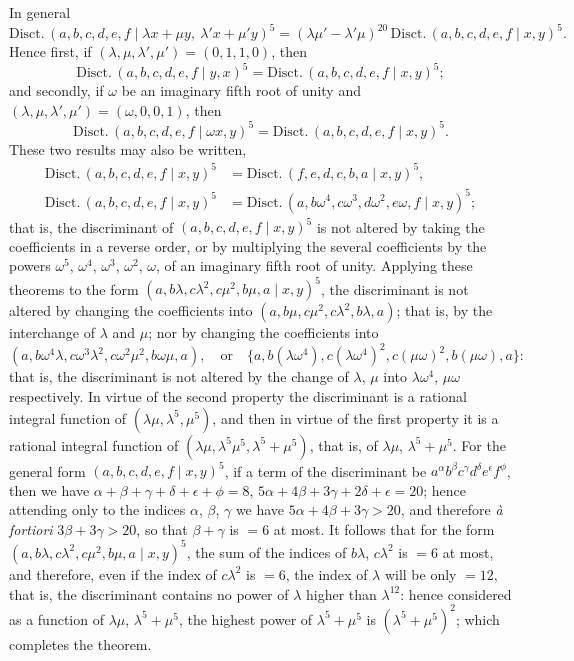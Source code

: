 \documentclass[11pt,a4paper]{article}
\renewcommand{\mid}{\mathbin{|}}
\begin{document}
In general
\[
\text{Disct.}\,(a, b, c, d, e, f\!\!\mid\!\lambda x+\mu y,\ \lambda'x+\mu'y)^5 = (\lambda\mu' - \lambda'\mu)^{20}\,\text{Disct.}\,(a, b, c, d, e, f\!\!\mid\! x, y)^5.
\]
Hence first, if $(\lambda, \mu, \lambda', \mu') = (0, 1, 1, 0)$, then
\[
\text{Disct.}\,(a, b, c, d, e, f\!\!\mid\! y, x)^5 = \text{Disct.}\,(a, b, c, d, e, f\!\!\mid\! x, y)^5;
\]
and secondly, if $\omega$ be an imaginary fifth root of unity and $(\lambda, \mu, \lambda', \mu') = (\omega, 0, 0, 1)$,
then
\[
\text{Disct.}\,(a, b, c, d, e, f\!\!\mid\! \omega x, y)^5 = \text{Disct.}\,(a, b, c, d, e, f\!\!\mid\! x, y)^5.
\]
These two results may also be written,
\begin{align*}
\text{Disct.}\,(a, b, c, d, e, f\!\!\mid\! x, y)^5 &= \text{Disct.}\,(f, e, d, c, b, a\!\!\mid\! x, y)^5,\\
\text{Disct.}\,(a, b, c, d, e, f\!\!\mid\! x, y)^5 &= \text{Disct.}\,(a, b\omega^4, c\omega^3, d\omega^2, e\omega, f\!\!\mid\! x, y)^5;
\end{align*}
that is, the discriminant of $(a, b, c, d, e, f\!\!\mid\! x, y)^5$ is not altered by taking the coefficients in
a reverse order, or by multiplying the several coefficients by the powers $\omega^5$, $\omega^4$, $\omega^3$, $\omega^2$, $\omega$, of an
imaginary fifth root of unity. Applying these theorems to the form $(a, b\lambda, c\lambda^2, c\mu^2, b\mu, a\!\!\mid\! x, y)^5$,
the discriminant is not altered by changing the coefficients into $(a, b\mu, c\mu^2, c\lambda^2, b\lambda, a)$;
that is, by the interchange of $\lambda$ and $\mu$; nor by changing the coefficients into
\[
(a, b\omega^4\lambda, c\omega^3\lambda^2, c\omega^2\mu^2, b\omega\mu, a), \quad \text{or}\quad \{a, b(\lambda\omega^4), c(\lambda\omega^4)^2, c(\mu\omega)^2, b(\mu\omega), a\}:
\]
that is, the discriminant is not altered by the change of $\lambda$, $\mu$ into $\lambda\omega^4$, $\mu\omega$ respectively. In
virtue of the second property the discriminant is a rational integral function of $(\lambda\mu, \lambda^5, \mu^5)$,
and then in virtue of the first property it is a rational integral function of $(\lambda\mu, \lambda^5\mu^5, \lambda^5+\mu^5)$,
that is, of $\lambda\mu$, $\lambda^5+\mu^5$. For the general form $(a, b, c, d, e, f\!\!\mid\! x, y)^5$, if a term of the
discriminant be $a^\alpha b^\beta c^\gamma d^\delta e^\epsilon f^\phi$, then we have $\alpha+\beta+\gamma+\delta+\epsilon+\phi=8$, $5\alpha+4\beta+3\gamma+2\delta+\epsilon=20$;
hence attending only to the indices $\alpha$, $\beta$, $\gamma$ we have $5\alpha+4\beta+3\gamma > 20$, and therefore
\textit{\`{a} fortiori} $3\beta+3\gamma > 20$, so that $\beta+\gamma$ is $=6$ at most. It follows that for the form
$(a, b\lambda, c\lambda^2, c\mu^2, b\mu, a\!\!\mid\! x, y)^5$, the sum of the indices of $b\lambda$, $c\lambda^2$ is $=6$ at most, and
therefore, even if the index of $c\lambda^2$ is $=6$, the index of $\lambda$ will be only $=12$, that is, the
discriminant contains no power of $\lambda$ higher than $\lambda^{12}$: hence considered as a function of
$\lambda\mu$, $\lambda^5+\mu^5$, the highest power of $\lambda^5+\mu^5$ is $(\lambda^5+\mu^5)^2$; which completes the theorem.
\end{document}
